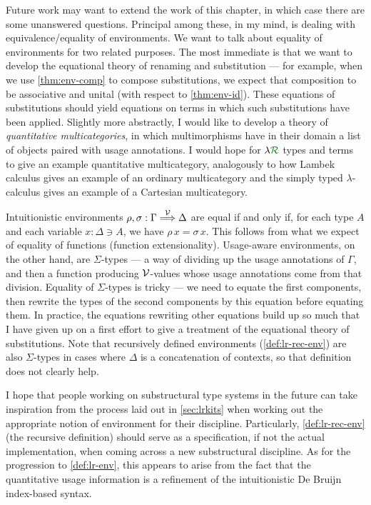 Future work may want to extend the work of this chapter, in which case
there are some unanswered questions.
Principal among these, in my mind, is dealing with equivalence/equality of
environments.
We want to talk about equality of environments for two related purposes.
The most immediate is that we want to develop the equational theory of renaming
and substitution --- for example, when we use \cref{thm:env-comp} to compose
substitutions, we expect that composition to be associative and unital (with
respect to \cref{thm:env-id}).
These equations of substitutions should yield equations on terms in which such
substitutions have been applied.
Slightly more abstractly, I would like to develop a theory of
\emph{quantitative multicategories}, in which multimorphisms have in their
domain a list of objects paired with usage annotations.
I would hope for $\name$ types and terms to give an example quantitative
multicategory, analogously to how Lambek calculus gives an example of an
ordinary multicategory and the simply typed $\lambda$-calculus gives an example
of a Cartesian multicategory.

Intuitionistic environments $\rho, \sigma : \Gamma \stackrel{\mathcal V}\Longrightarrow \Delta$ are equal
if and only if, for each type $A$ and each variable $x : \Delta \ni A$, we have
$\rho\,x = \sigma\,x$.
This follows from what we expect of equality of functions (function
extensionality).
Usage-aware environments, on the other hand, are $\Sigma$-types --- a way of
dividing up the usage annotations of $\Gamma$, and then a function producing
$\mathcal V$-values whose usage annotations come from that division.
Equality of $\Sigma$-types is tricky --- we need to equate the first components,
then rewrite the types of the second components by this equation before equating
them.
In practice, the equations rewriting other equations build up so much that
I have given up on a first effort to give a treatment of the equational theory
of substitutions.
Note that recursively defined environments (\cref{def:lr-rec-env}) are also
$\Sigma$-types in cases where $\Delta$ is a concatenation of contexts, so that
definition does not clearly help.

I hope that people working on substructural type systems in the future can take
inspiration from the process laid out in \cref{sec:lrkits} when working out the
appropriate notion of environment for their discipline.
Particularly, \cref{def:lr-rec-env} (the recursive definition) should serve as a
specification, if not the actual implementation, when coming across a new
substructural discipline.
As for the progression to \cref{def:lr-env}, this appears to arise from the fact
that the quantitative usage information is a refinement of the intuitionistic De
Bruijn index-based syntax.
